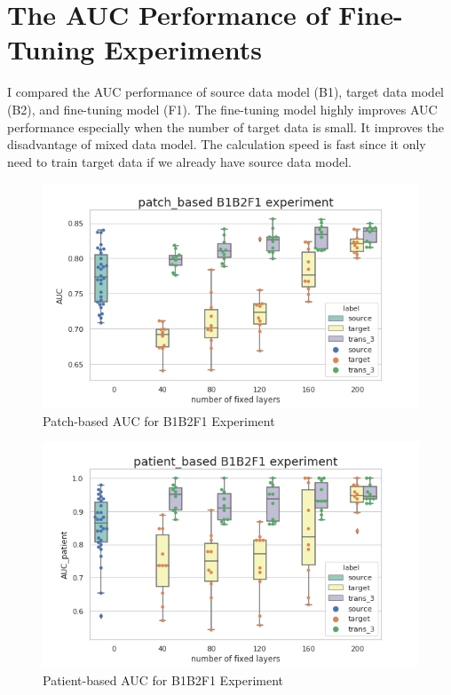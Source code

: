 \section{The AUC Performance of Fine-Tuning Experiments}
I compared the AUC performance of source data model (B1), target data model (B2), and fine-tuning model (F1). The fine-tuning model highly improves AUC performance especially when the number of target data is small. It improves the disadvantage of mixed data model. The calculation speed is fast since it only need to train target data if we already have source data model. 
 \\

\begin{figure}[H]
    \hfil
    \begin{minipage}[t]{0.9\textwidth}
        \includegraphics[width=\textwidth]{fig/B1B2F1_num_patch.png}
        \caption{\label{fig:parallel1}Patch-based AUC for B1B2F1 Experiment}
    \end{minipage}
    \hfil
\end{figure}
\begin{figure}[H]
    \hfil
    \begin{minipage}[t]{0.9\textwidth}
        \includegraphics[width=\textwidth]{fig/B1B2F1_num_patient.png}
        \caption{\label{fig:parallel1}Patient-based AUC for B1B2F1 Experiment}
    \end{minipage}
    \hfil
\end{figure}


